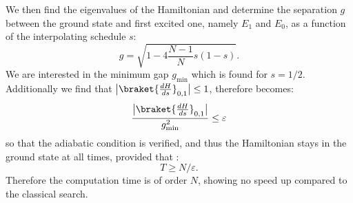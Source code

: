     We then find the eigenvalues of the Hamiltonian and determine the separation $g$ between the ground state and first excited one, namely $E_1$ and $E_0$, as a function of the interpolating schedule $s$:
    \begin{equation}
      g=\sqrt{1-4\frac{N-1}{N}s(1-s)}.
      \label{separation}
    \end{equation}
    We are interested in the minimum gap $g_{\min}$ which is found for $s=1/2$. Additionally we find that $\big|\braket{\frac{dH}{ds}}_{0,1}\big| \leq 1$, therefore  becomes:
    \begin{equation}
      \frac{\big|\braket{\frac{dH}{ds}}_{0,1}\big|}{g_{\min}^2} \leq \varepsilon
      \label{adiabatic_condition}
    \end{equation}
    so that the adiabatic condition is verified, and thus the Hamiltonian stays in the ground state at all times, provided that :
    \begin{equation}
      T\geq N/\varepsilon.
      \label{eq:adiabatic_scaling_global}
    \end{equation}
    Therefore the computation time is of order $N$, showing no speed up compared to the classical search.

